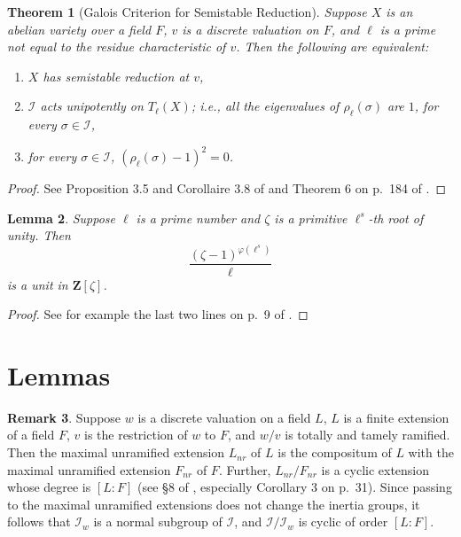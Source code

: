 \documentclass{amsart}
\def\Z{{\mathbf Z}}
\def\I{{\mathcal I}}
\newtheorem{thm}{Theorem}[section]
\newtheorem{lem}[thm]{Lemma}
\theoremstyle{definition}
\newtheorem{rem}[thm]{Remark}
\begin{document}
\begin{thm}[Galois Criterion for Semistable Reduction]
\label{galcrit}
Suppose $X$ is an abel\-ian variety over a field $F$, $v$ is a discrete 
valuation on $F$, and $\ell$ is a prime not equal to the residue
characteristic of $v$. 
Then the following are equivalent:
\begin{enumerate}
\item[(i)] $X$ has semistable reduction at $v$,
\item[(ii)] $\I$ acts unipotently on $T_\ell(X)$; i.e.,
all the eigenvalues of $\rho_{\ell}(\sigma)$ are $1$, 
for every $\sigma \in \I$,
\item[(iii)] for every $\sigma \in \I$, 
$(\rho_{\ell}(\sigma)-1)^2 = 0$.
\end{enumerate}
\end{thm}

\begin{proof}
See Proposition 3.5 and Corollaire 3.8 of \cite{SGA} 
and Theorem 6 on p.~184 of \cite{BLR}.
\end{proof}

\begin{lem}
\label{primrtsof1}
Suppose $\ell$ is a prime number and $\zeta$ is a primitive 
$\ell^s$-th root of unity. Then 
$$\frac{(\zeta-1)^{\varphi(\ell^s)}}{\ell}$$
is a unit in $\Z[\zeta]$.
\end{lem}

\begin{proof}
See for example the last two lines on p.~9 of \cite{Wash}.
\end{proof}

\section{Lemmas}
\label{ssredlemsect}

\begin{rem}
\label{cyclicrem}
Suppose $w$ is a discrete valuation on a field $L$, $L$ is a finite
extension of a field $F$, $v$ is the restriction of $w$ to $F$, 
and $w/v$ is totally and tamely ramified. 
Then the maximal unramified extension $L_{nr}$ of $L$ is the compositum
of $L$ with the maximal unramified extension $F_{nr}$ of $F$.
Further, $L_{nr}/F_{nr}$ is a cyclic extension whose degree is
$[L:F]$ (see \S8 of \cite{Frohlich}, especially Corollary 3 on p.~31).
Since passing to the maximal unramified extensions does not change
the inertia groups, 
it follows that $\I_{w}$ is a normal subgroup of $\I$, and 
$\I/\I_{w}$ is cyclic of order $[L:F]$.
\end{rem}
\end{document}
